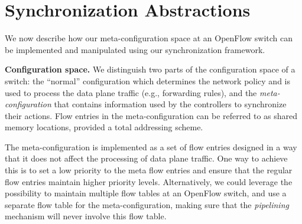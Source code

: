 \documentclass[conference]{sigcomm-alternate}
\begin{document}

%


\section{Synchronization Abstractions}\label{sec:main}

We now describe how our  meta-configuration space at
an OpenFlow switch can be implemented and manipulated using our
synchronization framework.

\vspace{1mm}
\noindent\textbf{Configuration space.}
%
We distinguish two parts of the configuration space of a switch:
the ``normal'' configuration which determines the network policy and
is used to process the data plane traffic (e.g., forwarding rules),
and the \emph{meta-configuration} that contains information used by the
controllers to synchronize their actions.
Flow entries in the meta-configuration can be referred to as shared
memory locations, provided a total addressing scheme.

The meta-configuration is implemented as a set of flow entries
designed in a way that it does not affect the processing of data plane
traffic. One way to achieve this is to set a low priority to
the meta flow entries and ensure that the regular flow entries
maintain higher priority levels.
Alternatively, we could leverage the possibility to maintain multiple
flow tables at an OpenFlow switch, and use a separate flow table for
the meta-configuration,  making sure that the
\emph{pipelining} mechanism will never involve this
flow table.
\end{document}
